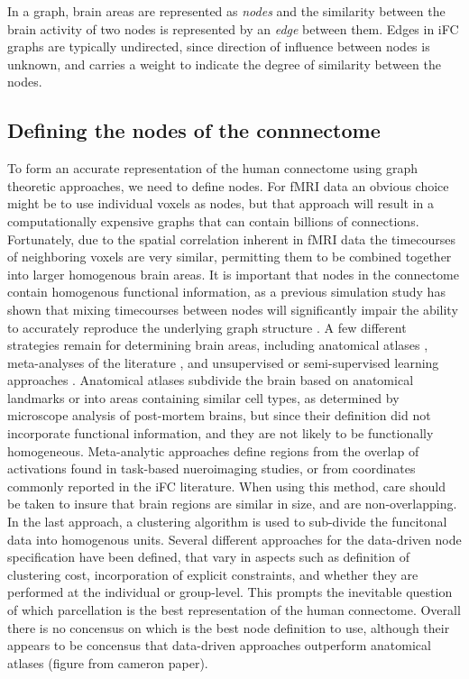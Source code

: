 In a graph, brain areas are represented as \emph{nodes} and the similarity between the brain activity of two nodes is represented by an \emph{edge} between them. Edges in iFC graphs are typically undirected, since direction of influence between nodes is unknown, and carries a weight to indicate the degree of similarity between the nodes. 
 
\subsection*{Defining the nodes of the connnectome}

To form an accurate representation of the human connectome using graph theoretic approaches, we need to define nodes. For fMRI data an obvious choice might be to use individual voxels as nodes, but that approach will result in a computationally expensive graphs that can contain billions of connections. Fortunately, due to the spatial correlation inherent in fMRI data the timecourses of neighboring voxels are very similar, permitting them to be combined together into larger homogenous brain areas. It is important that nodes in the connectome contain homogenous functional information, as a previous simulation study has shown that mixing timecourses between nodes will significantly impair the ability to accurately reproduce the underlying graph structure \cite{smith2009}. A few different strategies remain for determining brain areas, including anatomical atlases \cite{}, meta-analyses of the literature \cite{}, and unsupervised or semi-supervised learning approaches \cite{}. Anatomical atlases subdivide the brain based on anatomical landmarks or into areas containing similar cell types, as determined by microscope analysis of post-mortem brains, but since their definition did not incorporate functional information, and they are not likely to be functionally homogeneous. Meta-analytic approaches define regions from the overlap of activations found in task-based nueroimaging studies, or from coordinates commonly reported in the iFC literature. When using this method, care should be taken to insure that brain regions are similar in size, and are non-overlapping. In the last approach, a clustering algorithm is used to sub-divide the funcitonal data into homogenous units. Several different approaches for the data-driven node specification have been defined, that vary in aspects such as definition of clustering cost, incorporation of explicit constraints, and whether they are performed at the individual or group-level.  This prompts the inevitable question of which parcellation is the best representation of the human connectome. Overall there is no concensus on which is the best node definition to use, although their appears to be concensus that data-driven approaches outperform anatomical atlases (figure from cameron paper).

